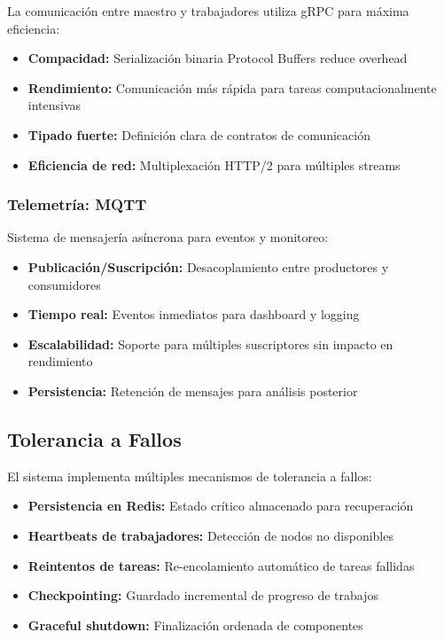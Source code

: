 La comunicación entre maestro y trabajadores utiliza gRPC para máxima eficiencia:

\begin{itemize}
    \item \textbf{Compacidad:} Serialización binaria Protocol Buffers reduce overhead
    \item \textbf{Rendimiento:} Comunicación más rápida para tareas computacionalmente intensivas
    \item \textbf{Tipado fuerte:} Definición clara de contratos de comunicación
    \item \textbf{Eficiencia de red:} Multiplexación HTTP/2 para múltiples streams
\end{itemize}

\subsubsection{Telemetría: MQTT}

Sistema de mensajería asíncrona para eventos y monitoreo:

\begin{itemize}
    \item \textbf{Publicación/Suscripción:} Desacoplamiento entre productores y consumidores
    \item \textbf{Tiempo real:} Eventos inmediatos para dashboard y logging
    \item \textbf{Escalabilidad:} Soporte para múltiples suscriptores sin impacto en rendimiento
    \item \textbf{Persistencia:} Retención de mensajes para análisis posterior
\end{itemize}

\subsection{Tolerancia a Fallos}

El sistema implementa múltiples mecanismos de tolerancia a fallos:

\begin{itemize}
    \item \textbf{Persistencia en Redis:} Estado crítico almacenado para recuperación
    \item \textbf{Heartbeats de trabajadores:} Detección de nodos no disponibles
    \item \textbf{Reintentos de tareas:} Re-encolamiento automático de tareas fallidas
    \item \textbf{Checkpointing:} Guardado incremental de progreso de trabajos
    \item \textbf{Graceful shutdown:} Finalización ordenada de componentes
\end{itemize}
